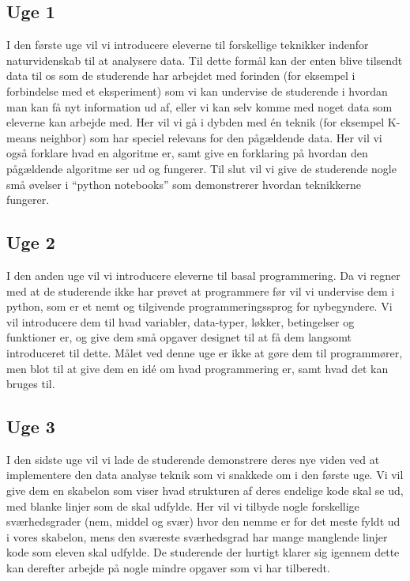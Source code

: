 \documentclass[11pt]{article}
\begin{document}
    \subsection*{Uge 1}
        I den første uge vil vi introducere eleverne til forskellige teknikker
        indenfor naturvidenskab til at analysere data. Til dette formål kan der
        enten blive tilsendt data til os som de studerende har arbejdet med forinden
        (for eksempel i forbindelse med et eksperiment) som vi kan undervise de
        studerende i hvordan man kan få nyt information ud af,
        eller vi kan selv komme med noget data som eleverne kan arbejde med.
        Her vil vi gå i dybden med én teknik (for eksempel K-means neighbor)
        som har speciel relevans for den pågældende data. Her vil vi også forklare
        hvad en algoritme er, samt give en forklaring på hvordan den
        pågældende algoritme ser ud og fungerer. Til slut vil vi give de
        studerende nogle små øvelser i ``python notebooks'' som demonstrerer
        hvordan teknikkerne fungerer.

    \subsection*{Uge 2}
        I den anden uge vil vi introducere eleverne til basal programmering. Da
        vi regner med at de studerende ikke har prøvet at programmere før
        vil vi undervise dem i python, som er et nemt og tilgivende
        programmeringssprog for nybegyndere. Vi vil introducere dem til hvad
        variabler, data-typer, løkker, betingelser og funktioner er, og give
        dem små opgaver designet til at få dem langsomt introduceret til
        dette. Målet ved denne uge er ikke at gøre dem til
        programmører, men blot til at give dem en idé om hvad programmering er,
        samt hvad det kan bruges til.

    \subsection*{Uge 3}
        I den sidste uge vil vi lade de studerende demonstrere deres nye viden
        ved at implementere den data analyse teknik som vi snakkede om i den
        første uge. Vi vil give dem en skabelon som viser hvad strukturen af
        deres endelige kode skal se ud, med blanke linjer som de skal udfylde.
        Her vil vi tilbyde nogle forskellige sværhedsgrader (nem, middel og svær)
        hvor den nemme er for det meste fyldt ud i vores skabelon, mens den
        sværeste sværhedsgrad har mange manglende linjer kode som eleven skal
        udfylde. De studerende der hurtigt klarer sig igennem dette kan derefter
        arbejde på nogle mindre opgaver som vi har tilberedt.
\end{document}
